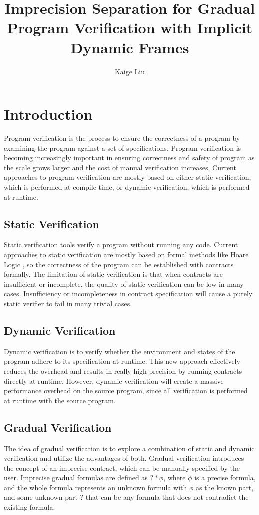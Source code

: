 \documentclass {article}
\title{Imprecision Separation for Gradual Program Verification with Implicit Dynamic Frames}
\author {Kaige Liu}
\date {}
\begin{document}
\maketitle
\section{Introduction}
Program verification is the process to ensure the correctness of a program by examining the program against a set of specifications. Program verification is becoming increasingly important in ensuring correctness and safety of program as the scale grows larger and the cost of manual verification increases. Current approaches to program verification are mostly based on either static verification, which is performed at compile time, or dynamic verification, which is performed at runtime.
\subsection{Static Verification}
Static verification tools verify a program without running any code. Current approaches to static verification are mostly based on formal methods like Hoare Logic \cite{p3},  so the correctness of the program can be established with contracts formally. The limitation of static verification is that when contracts are insufficient or incomplete, the quality of static verification can be low in many cases. Insufficiency or incompleteness in contract specification will cause a purely static verifier to fail in many trivial cases.
\subsection{Dynamic Verification}
Dynamic verification is to verify whether the environment and states of the program adhere to its specification at runtime. This new approach effectively reduces the overhead and results in really high precision by running contracts directly at runtime. However, dynamic verification will create a massive performance overhead on the source program, since all verification is performed at runtime with the source program. 

\subsection{Gradual Verification}
The idea of gradual verification \cite{p1} is to explore a combination of static and dynamic verification and utilize the advantages of both. Gradual verification introduces the concept of an imprecise contract, which can be manually specified by the user.  Imprecise gradual formulas are defined as $? * \phi$, where $\phi$ is a precise formula, and the whole formula represents an unknown formula with $\phi$ as the known part, and some unknown part $?$ that can be any formula that does not contradict the existing formula.\\
\end{document}
